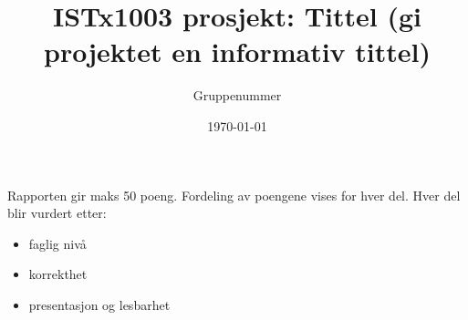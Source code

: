 \documentclass[]{article}
\title{ISTx1003 prosjekt: Tittel (gi projektet en informativ tittel)}
\author{Gruppenummer}
\date{\today}
\providecommand{\tightlist}{%
  \setlength{\itemsep}{0pt}\setlength{\parskip}{0pt}}
\begin{document}
\maketitle

Rapporten gir maks 50 poeng. Fordeling av poengene vises for hver del.
Hver del blir vurdert etter:
\begin{itemize}
\tightlist
\item faglig nivå
\item korrekthet
\item presentasjon og lesbarhet
\end{itemize}








\newpage


\newpage

\end{document}
